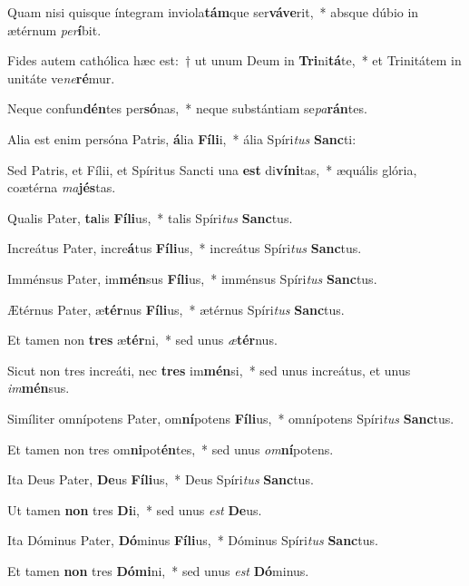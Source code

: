 \item Quam nisi quisque íntegram inviola\textbf{tám}que ser\textbf{vá}\textbf{ve}rit,~* absque dúbio in ætérnum \textit{per}\textbf{í}bit.
\item Fides autem cathólica hæc est:~† ut unum Deum in \textbf{Tri}ni\textbf{tá}te,~* et Trinitátem in unitáte ve\textit{ne}\textbf{ré}mur.
\item Neque confun\textbf{dén}tes per\textbf{só}nas,~* neque substántiam se\textit{pa}\textbf{rán}tes.
\item Alia est enim persóna Patris, \textbf{á}lia \textbf{Fí}\textbf{li}i,~* ália Spíri\textit{tus} \textbf{Sanc}ti:
\item Sed Patris, et Fílii, et Spíritus Sancti una \textbf{est} di\textbf{ví}\textbf{ni}tas,~* æquális glória, coætérna \textit{ma}\textbf{jés}tas.
\item Qualis Pater, \textbf{ta}lis \textbf{Fí}\textbf{li}us,~* talis Spíri\textit{tus} \textbf{Sanc}tus.
\item Increátus Pater, incre\textbf{á}tus \textbf{Fí}\textbf{li}us,~* increátus Spíri\textit{tus} \textbf{Sanc}tus.
\item Imménsus Pater, im\textbf{mén}sus \textbf{Fí}\textbf{li}us,~* imménsus Spíri\textit{tus} \textbf{Sanc}tus.
\item Ætérnus Pater, æ\textbf{tér}nus \textbf{Fí}\textbf{li}us,~* ætérnus Spíri\textit{tus} \textbf{Sanc}tus.
\item Et tamen non \textbf{tres} æ\textbf{tér}ni,~* sed unus \textit{æ}\textbf{tér}nus.
\item Sicut non tres increáti, nec \textbf{tres} im\textbf{mén}si,~* sed unus increátus, et unus \textit{im}\textbf{mén}sus.
\item Simíliter omnípotens Pater, om\textbf{ní}potens \textbf{Fí}\textbf{li}us,~* omnípotens Spíri\textit{tus} \textbf{Sanc}tus.
\item Et tamen non tres om\textbf{ni}pot\textbf{én}tes,~* sed unus \textit{om}\textbf{ní}potens.
\item Ita Deus Pater, \textbf{De}us \textbf{Fí}\textbf{li}us,~* Deus Spíri\textit{tus} \textbf{Sanc}tus.
\item Ut tamen \textbf{non} tres \textbf{Di}i,~* sed unus \textit{est} \textbf{De}us.
\item Ita Dóminus Pater, \textbf{Dó}minus \textbf{Fí}\textbf{li}us,~* Dóminus Spíri\textit{tus} \textbf{Sanc}tus.
\item Et tamen \textbf{non} tres \textbf{Dó}\textbf{mi}ni,~* sed unus \textit{est} \textbf{Dó}minus.
